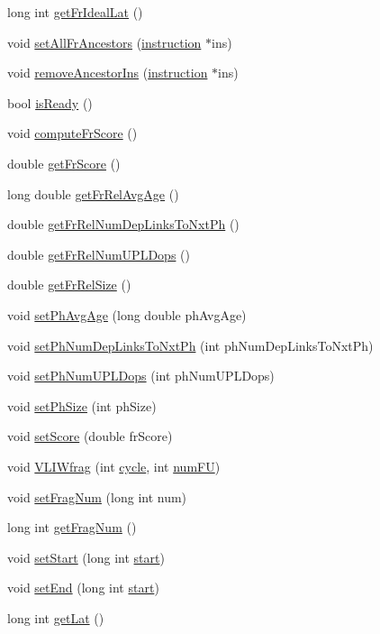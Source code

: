 \begin{DoxyCompactItemize}
long int \hyperlink{classfragment_a153c54dc61a825abfb1bc31c2361ad0f}{getFrIdealLat} ()
\item 
void \hyperlink{classfragment_ad85462ff233b30289592d30a7f912e69}{setAllFrAncestors} (\hyperlink{classinstruction}{instruction} $\ast$ins)
\item 
void \hyperlink{classfragment_af7ddc8217902791945779675f4727181}{removeAncestorIns} (\hyperlink{classinstruction}{instruction} $\ast$ins)
\item 
bool \hyperlink{classfragment_abf56277a83dfaf8d9e772dc975f3d2c6}{isReady} ()
\item 
void \hyperlink{classfragment_aaedc29f218f89cf851a75ae3093ef0a3}{computeFrScore} ()
\item 
double \hyperlink{classfragment_af8b6f798c7514a296855ba3032df9149}{getFrScore} ()
\item 
long double \hyperlink{classfragment_ac9b66a971cbeae791ce85b5939b40595}{getFrRelAvgAge} ()
\item 
double \hyperlink{classfragment_a77dbeb3aff85e771b16a3d9af59cb13f}{getFrRelNumDepLinksToNxtPh} ()
\item 
double \hyperlink{classfragment_aeedd611d7a3bdf4699b0fb64d85fb6b3}{getFrRelNumUPLDops} ()
\item 
double \hyperlink{classfragment_a8693d4747ded8fc10f1356aa5558c232}{getFrRelSize} ()
\item 
void \hyperlink{classfragment_a9b5625e3a82798624e16a747baf93078}{setPhAvgAge} (long double phAvgAge)
\item 
void \hyperlink{classfragment_a98217830bdd67193cc3cd784b427a15e}{setPhNumDepLinksToNxtPh} (int phNumDepLinksToNxtPh)
\item 
void \hyperlink{classfragment_a9614895d86593a6967506e1c424a46ef}{setPhNumUPLDops} (int phNumUPLDops)
\item 
void \hyperlink{classfragment_ae2cf355111d2112a3f388b8749a3bddb}{setPhSize} (int phSize)
\item 
void \hyperlink{classfragment_a0d271d84f4f7dc3fc50f92ff84bcc38a}{setScore} (double frScore)
\item 
void \hyperlink{classfragment_aec9f0320f42a1417a2fb59c57df575f2}{VLIWfrag} (int \hyperlink{vliwScheduler_8cpp_a1f4871d45089b039d95d3832dd123827}{cycle}, int \hyperlink{phraseGen_8cpp_ae0b3cf4db09e8c26c2ab03dbe18bfb19}{numFU})
\item 
void \hyperlink{classfragment_a6159b12f01d9a5214aa35c6612a58316}{setFragNum} (long int num)
\item 
long int \hyperlink{classfragment_ae9387817bc211427231780adf9973fe4}{getFragNum} ()
\item 
void \hyperlink{classfragment_a50d5fb572b0336f5c4fd28f3f4877d97}{setStart} (long int \hyperlink{bkEnd_8cpp_ada310e7f72b38fadd4b24d80ed3438ee}{start})
\item 
void \hyperlink{classfragment_a8de0712e74090643f9a65862b296b995}{setEnd} (long int \hyperlink{bkEnd_8cpp_ada310e7f72b38fadd4b24d80ed3438ee}{start})
\item 
long int \hyperlink{classfragment_a5e3e805070f60f4498372e304835d162}{getLat} ()
\end{DoxyCompactItemize}


